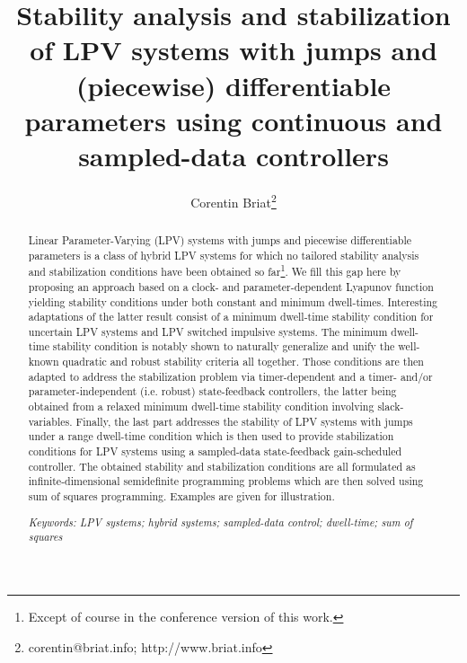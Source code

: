 \documentclass[12pt]{article}
\def\citep{\cite}
\begin{document}
\title{Stability analysis and stabilization of LPV systems with jumps and (piecewise) differentiable parameters using continuous and sampled-data controllers}%

\author{Corentin Briat\thanks{corentin@briat.info; http://www.briat.info}}
\date{}

%

\maketitle

\begin{abstract}
Linear Parameter-Varying (LPV) systems with jumps and piecewise differentiable parameters is a class of hybrid LPV systems for which no tailored stability analysis and stabilization conditions have been obtained so far\footnote{Except of course in the conference version of this work.}. We fill this gap here by proposing an approach based on a clock- and parameter-dependent Lyapunov function yielding stability conditions under both constant and minimum dwell-times. Interesting adaptations of the latter result consist of a minimum dwell-time stability condition for uncertain LPV systems and LPV switched impulsive systems. The minimum dwell-time stability condition is notably shown to naturally generalize and unify the well-known quadratic and robust stability criteria all together. Those conditions are then adapted to address the stabilization problem via timer-dependent and a timer- and/or parameter-independent (i.e. robust) state-feedback controllers, the latter being obtained from a relaxed minimum dwell-time stability condition involving slack-variables. Finally, the last part addresses the stability of LPV systems with jumps under a range dwell-time condition which is then used to provide stabilization conditions for LPV systems using a sampled-data state-feedback gain-scheduled controller. The obtained stability and stabilization conditions are all formulated as infinite-dimensional semidefinite programming problems which are then solved using sum of squares programming. Examples are given for illustration.

\noindent\textit{Keywords: LPV systems; hybrid systems; sampled-data control; dwell-time; sum of squares}
\end{abstract}
\end{document}
